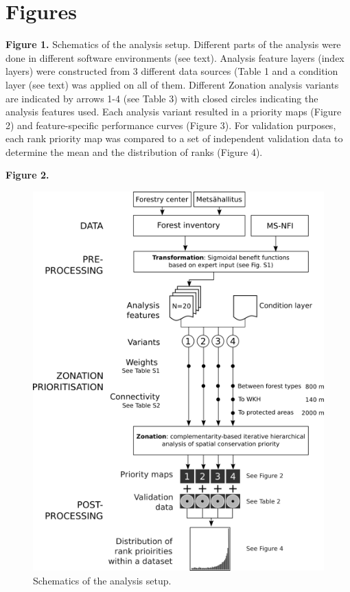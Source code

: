 \section{Figures}

\textbf{Figure 1.} Schematics of the analysis setup. Different parts of
the analysis were done in different software environments (see text).
Analysis feature layers (index layers) were constructed from 3 different
data sources (Table 1 and a condition layer (see text) was applied on
all of them. Different Zonation analysis variants are indicated by
arrows 1-4 (see Table 3) with closed circles indicating the analysis
features used. Each analysis variant resulted in a priority maps (Figure
2) and feature-specific performance curves (Figure 3). For validation
purposes, each rank priority map was compared to a set of independent
validation data to determine the mean and the distribution of ranks
(Figure 4).

\textbf{Figure 2.}

\begin{figure}
  \includegraphics{figs/Fig1_w500.png}
  \caption{Schematics of the analysis setup.}
  \end{figure}

